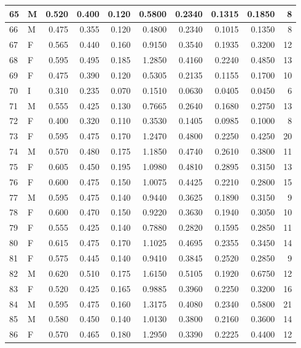 \documentclass[9pt,twocolumn,twoside,]{pnas-new}
\begin{document}
\begin{tabular}{l|l|r|r|r|r|r|r|r|r}
\hline
65 & M & 0.520 & 0.400 & 0.120 & 0.5800 & 0.2340 & 0.1315 & 0.1850 & 8\\
\hline
66 & M & 0.475 & 0.355 & 0.120 & 0.4800 & 0.2340 & 0.1015 & 0.1350 & 8\\
\hline
67 & F & 0.565 & 0.440 & 0.160 & 0.9150 & 0.3540 & 0.1935 & 0.3200 & 12\\
\hline
68 & F & 0.595 & 0.495 & 0.185 & 1.2850 & 0.4160 & 0.2240 & 0.4850 & 13\\
\hline
69 & F & 0.475 & 0.390 & 0.120 & 0.5305 & 0.2135 & 0.1155 & 0.1700 & 10\\
\hline
70 & I & 0.310 & 0.235 & 0.070 & 0.1510 & 0.0630 & 0.0405 & 0.0450 & 6\\
\hline
71 & M & 0.555 & 0.425 & 0.130 & 0.7665 & 0.2640 & 0.1680 & 0.2750 & 13\\
\hline
72 & F & 0.400 & 0.320 & 0.110 & 0.3530 & 0.1405 & 0.0985 & 0.1000 & 8\\
\hline
73 & F & 0.595 & 0.475 & 0.170 & 1.2470 & 0.4800 & 0.2250 & 0.4250 & 20\\
\hline
74 & M & 0.570 & 0.480 & 0.175 & 1.1850 & 0.4740 & 0.2610 & 0.3800 & 11\\
\hline
75 & F & 0.605 & 0.450 & 0.195 & 1.0980 & 0.4810 & 0.2895 & 0.3150 & 13\\
\hline
76 & F & 0.600 & 0.475 & 0.150 & 1.0075 & 0.4425 & 0.2210 & 0.2800 & 15\\
\hline
77 & M & 0.595 & 0.475 & 0.140 & 0.9440 & 0.3625 & 0.1890 & 0.3150 & 9\\
\hline
78 & F & 0.600 & 0.470 & 0.150 & 0.9220 & 0.3630 & 0.1940 & 0.3050 & 10\\
\hline
79 & F & 0.555 & 0.425 & 0.140 & 0.7880 & 0.2820 & 0.1595 & 0.2850 & 11\\
\hline
80 & F & 0.615 & 0.475 & 0.170 & 1.1025 & 0.4695 & 0.2355 & 0.3450 & 14\\
\hline
81 & F & 0.575 & 0.445 & 0.140 & 0.9410 & 0.3845 & 0.2520 & 0.2850 & 9\\
\hline
82 & M & 0.620 & 0.510 & 0.175 & 1.6150 & 0.5105 & 0.1920 & 0.6750 & 12\\
\hline
83 & F & 0.520 & 0.425 & 0.165 & 0.9885 & 0.3960 & 0.2250 & 0.3200 & 16\\
\hline
84 & M & 0.595 & 0.475 & 0.160 & 1.3175 & 0.4080 & 0.2340 & 0.5800 & 21\\
\hline
85 & M & 0.580 & 0.450 & 0.140 & 1.0130 & 0.3800 & 0.2160 & 0.3600 & 14\\
\hline
86 & F & 0.570 & 0.465 & 0.180 & 1.2950 & 0.3390 & 0.2225 & 0.4400 & 12\\

\end{tabular}
\end{document}
